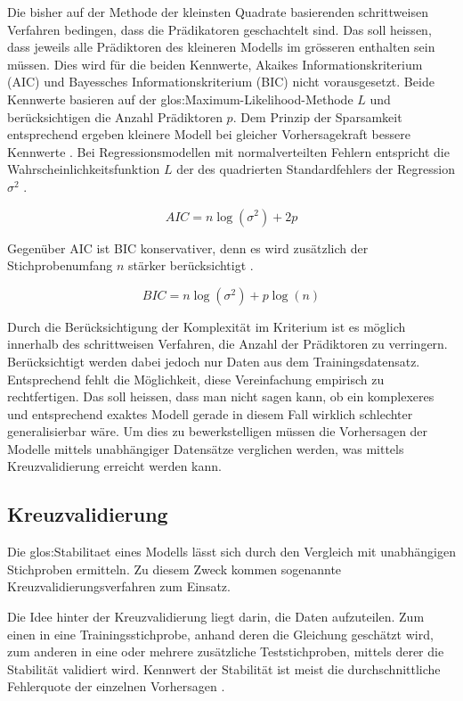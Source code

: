 Die bisher auf der Methode der kleinsten Quadrate basierenden schrittweisen Verfahren bedingen, dass die Prädikatoren geschachtelt sind. 
Das soll heissen, dass jeweils alle Prädiktoren des kleineren Modells im grösseren enthalten sein müssen. 
Dies wird für die  beiden Kennwerte, Akaikes Informationskriterium (AIC) und  Bayessches Informationskriterium (BIC) nicht vorausgesetzt. 
Beide Kennwerte basieren auf der \Gls{glos:Maximum-Likelihood-Methode} $L$ und  berücksichtigen die Anzahl Prädiktoren $p$. 
Dem Prinzip der Sparsamkeit entsprechend ergeben kleinere Modell bei gleicher Vorhersagekraft bessere Kennwerte \cite[p. 509]{jacob2003applied}. 
Bei Regressionsmodellen mit normalverteilten Fehlern entspricht die Wahrscheinlichkeitsfunktion $L$ der des quadrierten Standardfehlers der Regression $\sigma^2$ \cite[p. 169]{weakliem2004introduction}. 

\begin{equation}
AIC = n \log(\sigma^2) + 2p
\tag{AIC}
\end{equation}

Gegenüber AIC ist BIC konservativer, denn es wird zusätzlich der Stichprobenumfang $n$ stärker berücksichtigt \cite[p. 169]{weakliem2004introduction}. 

\begin{equation}
BIC = n\log(\sigma^2) + p\log(n)
\tag{BIC}
\end{equation}

Durch die Berücksichtigung der Komplexität im Kriterium ist es möglich innerhalb des schrittweisen Verfahren, die Anzahl der Prädiktoren zu verringern.  Berücksichtigt werden dabei jedoch nur Daten aus dem Trainingsdatensatz. Entsprechend fehlt die Möglichkeit, diese Vereinfachung empirisch zu rechtfertigen. Das soll heissen, dass man nicht sagen kann, ob ein komplexeres und entsprechend exaktes Modell gerade in diesem Fall wirklich schlechter generalisierbar wäre. Um dies zu bewerkstelligen müssen die Vorhersagen der Modelle mittels unabhängiger Datensätze verglichen werden, was mittels Kreuzvalidierung erreicht werden kann. 

\subsection{Kreuzvalidierung}
Die \Gls{glos:Stabilitaet} eines Modells lässt sich durch den Vergleich mit unabhängigen Stichproben ermitteln.
Zu diesem Zweck kommen sogenannte Kreuzvalidierungsverfahren zum Einsatz.

Die Idee hinter der Kreuzvalidierung liegt darin, die Daten aufzuteilen. Zum einen in eine Trainingsstichprobe, anhand deren die Gleichung geschätzt wird, zum anderen in eine oder mehrere zusätzliche Teststichproben, mittels derer die Stabilität validiert wird. Kennwert der Stabilität ist meist die durchschnittliche Fehlerquote der einzelnen Vorhersagen \cite[p. 3]{arlot2010survey}. 

